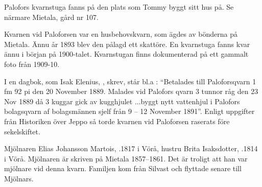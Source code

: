 Palofors kvarnstuga fanns på den plats som Tommy byggt sitt hus på. Se närmare Mietala, gård nr 107.


%

\jhnooccupant{}


Kvarnen vid Paloforsen var en husbehovskvarn, som ägdes av bönderna på 	Mietala. Ännu år 1893 blev den pålagd ett skattöre. En kvarnstuga fanns kvar ännu i början på 1900-talet. Kvarnstugan finns dokumenterad på ett gammalt foto från 1909-10.

I en dagbok, som Isak Elenius, , skrev,  står bl.a : ``Betalades till Paloforsqvarn 1 fm 92 pi den 20 November 1889. Malades vid Palofors qvarn 3 tunnor råg den 23  Nov 1889 då 3 kuggar gick av kugghjulet 	...byggt nytt vattenhjul i Palofors bolagsqvarn af bolagsmännen sjelf från 9 – 12 November 1891''. Enligt uppgifter från Historiken över Jeppo så torde kvarnen vid Paloforsen raserats före sekelskiftet.


%
Mjölnaren Elias Johansson Martois, .1817 i Vörå, hustru Brita Isaksdotter, .1814 i Vörå. Mjölnaren är skriven på Mietala 1857–1861. Det är troligt att han var mjölnare vid denna kvarn. Familjen kom från Silvast och flyttade senare till Mjölnars.
\begin{jhchildren}
  \item {}
  \item {}
  \item {}
  \item {}
  \item {}
  \item {}
  \item {}
  \item {}
\end{jhchildren}



